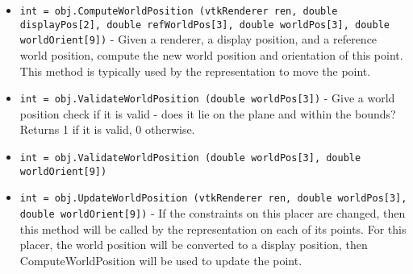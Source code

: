 \begin{itemize}
\item  \verb|int = obj.ComputeWorldPosition (vtkRenderer ren, double displayPos[2], double refWorldPos[3], double worldPos[3], double worldOrient[9])| -  Given a renderer, a display position, and a reference world
 position, compute the new world position and orientation 
 of this point. This method is typically used by the 
 representation to move the point.

\item  \verb|int = obj.ValidateWorldPosition (double worldPos[3])| -  Give a world position check if it is valid - does
 it lie on the plane and within the bounds? Returns
 1 if it is valid, 0 otherwise.

\item  \verb|int = obj.ValidateWorldPosition (double worldPos[3], double worldOrient[9])|

\item  \verb|int = obj.UpdateWorldPosition (vtkRenderer ren, double worldPos[3], double worldOrient[9])| -  If the constraints on this placer are changed, then
 this method will be called by the representation on
 each of its points. For this placer, the world
 position will be converted to a display position, then
 ComputeWorldPosition will be used to update the 
 point.

\end{itemize}
